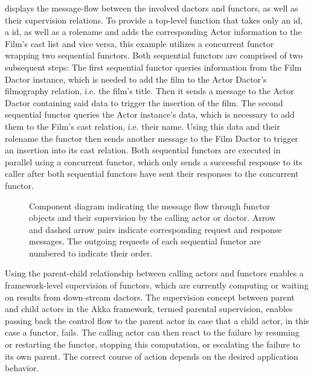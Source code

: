      displays the message-flow between the involved \glspl{dactor} and \glspl{functor}, as well as their supervision relations.
    To provide a top-level function that takes only an  id, a  id, as well as a rolename and adds the corresponding Actor information to the Film's cast list and vice versa, this example utilizes a concurrent \gls{functor} wrapping two sequential \glspl{functor}.
    Both sequential \glspl{functor} are comprised of two subsequent steps:
    The first sequential \gls{functor} queries information from the Film Dactor instance, which is needed to add the film to the Actor Dactor's filmography \gls{relation}, i.e. the film's title.
    Then it sends a message to the Actor Dactor containing said data to trigger the insertion of the film.
    The second sequential \gls{functor} queries the Actor instance's data, which is necessary to add them to the Film's cast \gls{relation}, i.e. their name.
    Using this data and their rolename the \gls{functor} then sends another message to the Film Dactor to trigger an insertion into its cast \gls{relation}.
    Both sequential \glspl{functor} are executed in parallel using a concurrent \gls{functor}, which only sends a successful response to its caller after both sequential \glspl{functor} have sent their responses to the concurrent \gls{functor}.
    
    \begin{figure}
      \centering
      
      \caption{Component diagram indicating the message flow through \gls{functor} objects and their supervision by the calling actor or \gls{dactor}. Arrow and dashed arrow pairs indicate corresponding request and response messages. The outgoing requests of each sequential \gls{functor} are numbered to indicate their order.}
      \label{fig:functor_diagram}
    \end{figure}
    
    Using the parent-child relationship between calling actors and \glspl{functor} enables a framework-level supervision of \glspl{functor}, which are currently computing or waiting on results from down-stream \glspl{dactor}.
    The supervision concept between parent and child actors in the Akka framework, termed parental supervision, enables passing back the control flow to the parent actor in case that a child actor, in this case a \gls{functor}, fails.
    The calling actor can then react to the failure by resuming or restarting the \gls{functor}, stopping this computation, or escalating the failure to its own parent.
    The correct course of action depends on the desired application behavior.
  
